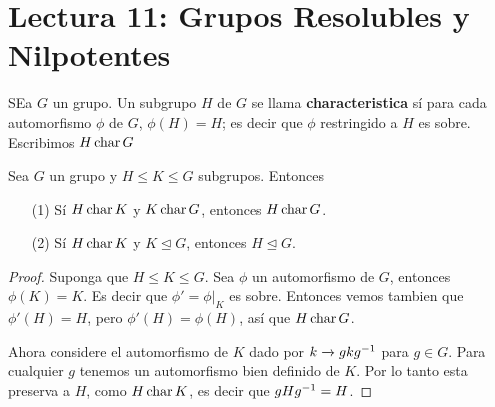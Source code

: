 \section*{Lectura 11: Grupos Resolubles y Nilpotentes}

\begin{definition}
    SEa $G$ un grupo. Un subgrupo $H$ de $G$ se llama \textbf{characteristica}
    s\'i para cada automorfismo $\phi$ de $G$, $\phi(H)=H$; es decir que $\phi$
    restringido a $H$ es sobre. Escribimos $H \operatorname{char}{G}$
\end{definition}

\begin{lemma}\label{11.46}
    Sea $G$ un grupo y  $H \leq K \leq G$ subgrupos. Entonces
    \begin{enumerate}
        \item[(1)] S\'i $H \operatorname{char}{K}$ y $K \operatorname{char}{G}$, entonces $H \operatorname{char}{G}$.

        \item[(2)] S\'i $H \operatorname{char} K$ y  $K \unlhd G$, entonces  $H \unlhd G$.
    \end{enumerate}
\end{lemma}
\begin{proof}
    Suponga que $H \leq K \leq G$. Sea  $\phi$ un automorfismo de $G$, entonces
    $\phi(K)=K$. Es decir que $\phi'=\phi|_K$ es sobre. Entonces vemos tambien
    que $\phi'(H)=H$, pero $\phi'(H)=\phi(H)$, as\'i que $H \operatorname{char}{G}$.

    Ahora considere el automorfismo de $K$ dado por  $k \xrightarrow{}
    gkg^{-1}$ para $g \in G$. Para cualquier $g$ tenemos un automorfismo bien
    definido de $K$. Por lo tanto esta preserva a  $H$, como  $H \operatorname{char}{K}$, es
    decir que $gHg^{-1}=H$.
\end{proof}
